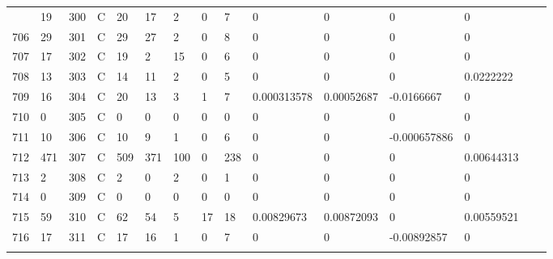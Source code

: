 \begin{longtable}{lllllllllllllll}
\begin{comment}
	705 & 19                & 300 & C   & 20                & 17                & 2                 & 0    & 7          & 0              & 0              & 0             & 0            \\
	706 & 29                & 301 & C   & 29                & 27                & 2                 & 0    & 8          & 0              & 0              & 0             & 0            \\
	707 & 17                & 302 & C   & 19                & 2                 & 15                & 0    & 6          & 0              & 0              & 0             & 0            \\
	708 & 13                & 303 & C   & 14                & 11                & 2                 & 0    & 5          & 0              & 0              & 0             & 0.0222222    \\
	709 & 16                & 304 & C   & 20                & 13                & 3                 & 1    & 7          & 0.000313578    & 0.00052687     & -0.0166667    & 0            \\
	710 & 0                 & 305 & C   & 0                 & 0                 & 0                 & 0    & 0          & 0              & 0              & 0             & 0            \\
	711 & 10                & 306 & C   & 10                & 9                 & 1                 & 0    & 6          & 0              & 0              & -0.000657886  & 0            \\
	712 & 471               & 307 & C   & 509               & 371               & 100               & 0    & 238        & 0              & 0              & 0             & 0.00644313   \\
	713 & 2                 & 308 & C   & 2                 & 0                 & 2                 & 0    & 1          & 0              & 0              & 0             & 0            \\
	714 & 0                 & 309 & C   & 0                 & 0                 & 0                 & 0    & 0          & 0              & 0              & 0             & 0            \\
	715 & 59                & 310 & C   & 62                & 54                & 5                 & 17   & 18         & 0.00829673     & 0.00872093     & 0             & 0.00559521   \\
	716 & 17                & 311 & C   & 17                & 16                & 1                 & 0    & 7          & 0              & 0              & -0.00892857   & 0            \\

\end{comment}
\end{longtable}
